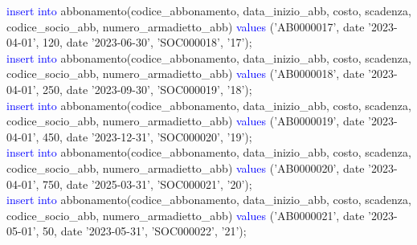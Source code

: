 \documentclass{article}
\begin{document}
\begin{flushleft}
{        \hspace*{0.5em}\textcolor{blue}{insert into} abbonamento(codice\_abbonamento, data\_inizio\_abb, costo, scadenza, \hspace*{0.5em}codice\_socio\_abb, numero\_armadietto\_abb) \textcolor{blue}{values} ('AB0000017', date '2023-04-01', \hspace*{0.5em}120, date '2023-06-30', 'SOC000018', '17'); \\
        \vspace{2mm}
        \hspace*{0.5em}\textcolor{blue}{insert into} abbonamento(codice\_abbonamento, data\_inizio\_abb, costo, scadenza, \hspace*{0.5em}codice\_socio\_abb, numero\_armadietto\_abb) \textcolor{blue}{values} ('AB0000018', date '2023-04-01', \hspace*{0.5em}250, date '2023-09-30', 'SOC000019', '18'); \\
        \vspace{2mm}
        \hspace*{0.5em}\textcolor{blue}{insert into} abbonamento(codice\_abbonamento, data\_inizio\_abb, costo, scadenza, \hspace*{0.5em}codice\_socio\_abb, numero\_armadietto\_abb) \textcolor{blue}{values} ('AB0000019', date '2023-04-01', \hspace*{0.5em}450, date '2023-12-31', 'SOC000020', '19'); \\
        \vspace{2mm}
        \hspace*{0.5em}\textcolor{blue}{insert into} abbonamento(codice\_abbonamento, data\_inizio\_abb, costo, scadenza, \hspace*{0.5em}codice\_socio\_abb, numero\_armadietto\_abb) \textcolor{blue}{values} ('AB0000020', date '2023-04-01', \hspace*{0.5em}750, date '2025-03-31', 'SOC000021', '20'); \\
        \vspace{2mm}
        \hspace*{0.5em}\textcolor{blue}{insert into} abbonamento(codice\_abbonamento, data\_inizio\_abb, costo, scadenza, \hspace*{0.5em}codice\_socio\_abb, numero\_armadietto\_abb) \textcolor{blue}{values} ('AB0000021', date '2023-05-01', \hspace*{0.5em}50, date '2023-05-31', 'SOC000022', '21'); \\
        \vspace{2mm}
}
\end{flushleft}
\end{document}
